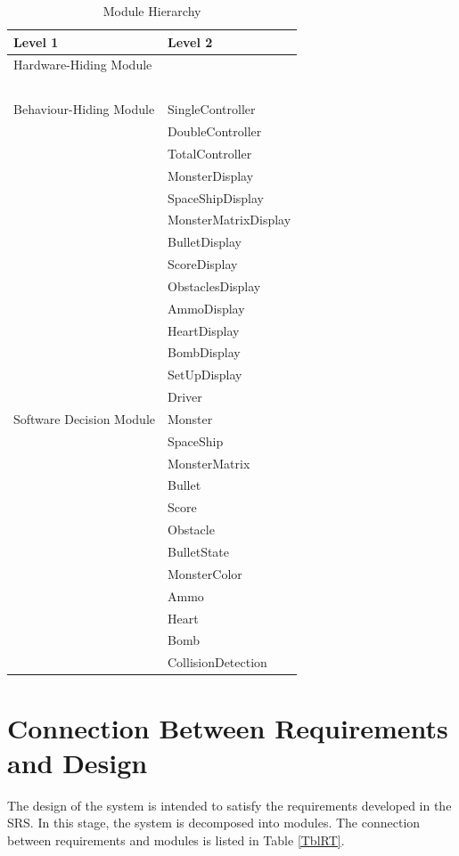 \documentclass[12pt]{article}
\begin{document}
\begin{table}[H]
\centering
\begin{tabular}{p{} p{}}
\toprule
\textbf{Level 1} & \textbf{Level 2}\\
\midrule

{Hardware-Hiding Module} & ~ \\
& ~ \\
\midrule

{Behaviour-Hiding Module} & SingleController\\
& DoubleController\\
& TotalController \\
& MonsterDisplay \\
& SpaceShipDisplay \\
& MonsterMatrixDisplay \\ 
& BulletDisplay \\
& ScoreDisplay \\
& ObstaclesDisplay\\
& AmmoDisplay\\
& HeartDisplay\\
& BombDisplay\\
& SetUpDisplay\\
& Driver\\
\midrule

{Software Decision Module} & Monster\\
& SpaceShip\\
& MonsterMatrix\\
& Bullet\\
& Score\\
& Obstacle\\
& BulletState\\
& MonsterColor\\
& Ammo\\
& Heart\\
& Bomb\\
& CollisionDetection\\
\bottomrule

\end{tabular}
\caption{Module Hierarchy}
\label{TblMH}
\end{table}
\section{Connection Between Requirements and Design} \label{SecConnection}

The design of the system is intended to satisfy the requirements developed in
the SRS. In this stage, the system is decomposed into modules. The connection
between requirements and modules is listed in Table \ref{TblRT}.
\end{document}
